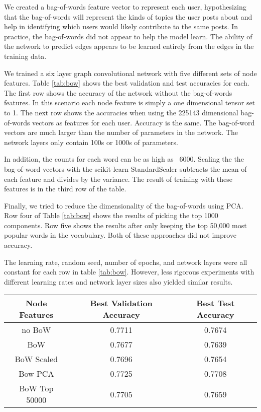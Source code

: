 \documentclass[10pt,twocolumn,letterpaper]{article}
\begin{document}
We created a bag-of-words feature vector to represent each user, hypothesizing that the bag-of-words will represent the kinds of topics the user posts about and help in identifying which users would likely contribute to the same posts. In practice, the bag-of-words did not appear to help the model learn. The ability of the network to predict edges appears to be learned entirely from the edges in the training data.

We trained a six layer graph convolutional network with five different sets of node features. Table \ref{tab:bow} shows the best validation and test accuracies for each. The first row shows the accuracy of the network without the bag-of-words features. In this scenario each node feature is simply a one dimensional tensor set to 1.
The next row shows the accuracies when using the 225143 dimensional bag-of-words vectors as features for each user. Accuracy is the same. The bag-of-word vectors are much larger than the number of parameters in the network. 
The network layers only contain 100s or 1000s of parameters. 

In addition, the counts for each word can be as high as ~6000. Scaling the the bag-of-word vectors with the scikit-learn StandardScaler subtracts the mean of each feature and divides by the variance. The result of training with these features is in the third row of the table.

Finally, we tried to reduce the dimensionality of the bag-of-words using PCA. Row four of Table \ref{tab:bow}  shows the results of picking the top 1000 components. Row five shows the results after only keeping the top 50,000 most popular words in the vocabulary. Both of these approaches did not improve accuracy.

The learning rate, random seed, number of epochs, and network layers were all constant for each row in table \ref{tab:bow}. However, less rigorous experiments with different learning rates and network layer sizes also yielded similar results.


\begin{table*}[h!]
\begin{center}
   \begin{tabular}{ |c |c |c |}
   \hline
   \bf{Node Features} & \bf{Best Validation Accuracy} & \bf{Best Test Accuracy} \\
   \hline 
   no BoW & 0.7711 & 0.7674 \\
   \hline  
   BoW & 0.7677 & 0.7639 \\
   \hline  
   BoW Scaled & 0.7696 & 0.7654 \\
   \hline  
   Bow PCA & 0.7725 & 0.7708 \\  
   \hline  
   BoW Top 50000 & 0.7705 & 0.7659 \\
   \hline
   \end{tabular}
   \end{center}
   \caption{Bag-of-Words Effect on Accuracy}
   \label{tab:bow}
\end{table*}
\end{document}
